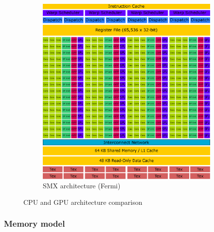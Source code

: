 \begin{figure}[p]
\begin{subfigure}{0.6\textwidth}
  \centering
  \includegraphics[width=0.9\linewidth]{img/SMXArchitecture.eps}
  \caption{SMX architecture (Fermi)}
  \label{fig:smxarchitecture}
\end{subfigure}%
\caption{CPU and GPU architecture comparison}
\end{figure}

\subsubsection{Memory model}

